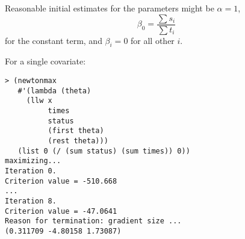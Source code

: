 \begin{slide}{}
Reasonable initial estimates for the parameters might be
$\alpha=1$,
\begin{displaymath}
\beta_{0} =\frac{\sum s_{i}}{\sum t_{i}}
\end{displaymath}
for the constant term, and $\beta_{i}=0$ for all other $i$.

For a single covariate:
{\Large
\begin{verbatim}
> (newtonmax
   #'(lambda (theta)
     (llw x
          times
          status 
          (first theta)
          (rest theta)))
   (list 0 (/ (sum status) (sum times)) 0))
maximizing...
Iteration 0.
Criterion value = -510.668
...
Iteration 8.
Criterion value = -47.0641
Reason for termination: gradient size ...
(0.311709 -4.80158 1.73087)
\end{verbatim}}
\end{slide}
